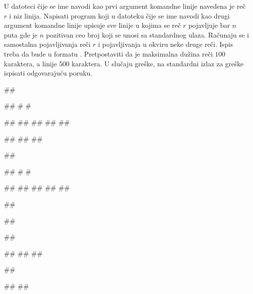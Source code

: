\begin{Exercise}[label=v3_04] 
U datoteci čije se ime navodi kao prvi argument komandne
linije navedena je reč $r$ i niz linija. Napisati
program koji u datoteku čije se ime navodi kao
drugi argument komandne linije upisuje sve linije
u kojima se reč $r$ pojavljuje bar $n$ puta gde je
$n$ pozitivan ceo broj koji se unosi sa standardnog ulaza. 
Računaju se i samostalna pojavljivanja reči $r$ i pojavljivanja u okviru neke druge reči. 
Ispis treba da bude u formatu .
Pretpostaviti da je maksimalna dužina reči $100$ karaktera, a linije $500$ karaktera.
U slučaju greške, na standardni izlaz za greške ispisati odgovarajuću poruku.
 
\begin{miditest}
\begin{upotreba}{1}
##

#\naslovInt#
# #

##
##
##
## 
##

##
## 
##
\end{upotreba}
\end{miditest}
\begin{miditest}
\begin{upotreba}{2}
##

#\naslovInt#
# #

##
##
##
## 
##

##

\end{upotreba}
\end{miditest}

\begin{miditest}
\begin{upotreba}{3}
##

##

#\naslovIzlazZaGresku#
##
##
\end{upotreba}
\end{miditest}
\begin{miditest}
\begin{upotreba}{4}
##

#\naslovIzlazZaGresku#
##
\end{upotreba}
\end{miditest}
\end{Exercise}
\begin{Answer}[ref=v3_04]
\end{Answer}


